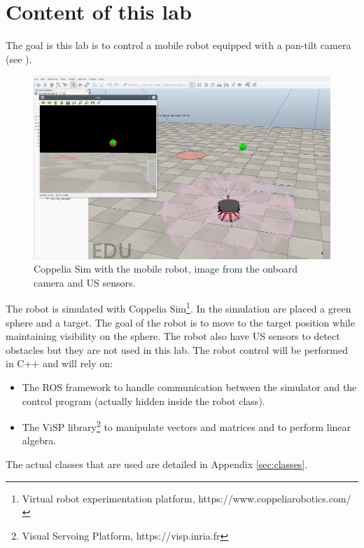 \documentclass{ecnreport}
\begin{document}




\section{Content of this lab}


The goal is this lab is to control a mobile robot equipped with a pan-tilt camera 
 (see ).

\begin{figure}[h!]\centering
 \includegraphics[width=.8\linewidth]{vrep}
 \caption{Coppelia Sim with the mobile robot, image from the onboard camera and US sensors.}
 \label{fig:vrep}
\end{figure}

The robot is simulated with Coppelia Sim\footnote{Virtual robot experimentation platform, https://www.coppeliarobotics.com/}.
In the simulation are placed a green sphere and a target. The goal of the robot is to move to the target position while maintaining visibility on the sphere. The robot also have US sensors
to detect obstacles but they are not used in this lab.
The robot control will be performed in C++ and will rely on:

\begin{itemize}
 \item The ROS framework to handle communication between the simulator and the control program (actually hidden inside the robot class).
 \item The ViSP library\footnote{Visual Servoing Platform, https://visp.inria.fr} to manipulate vectors and matrices and to perform linear algebra.
\end{itemize}
The actual classes that are used are detailed in Appendix \ref{sec:classes}.\\
\end{document}
